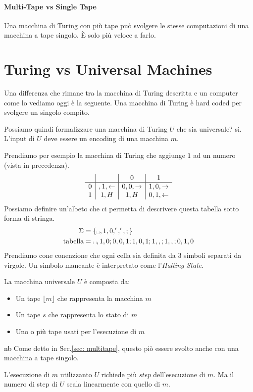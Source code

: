 \documentclass{article}
\begin{document}
\paragraph{Multi-Tape vs Single Tape}
Una macchina di Turing con più tape può svolgere le stesse computazioni di una macchina a tape singolo. È solo più veloce a farlo.

\section{Turing vs Universal Machines}
Una differenza che rimane tra la macchina di Turing descritta e un computer come lo vediamo oggi è la seguente. Una macchina di Turing è hard coded per svolgere un singolo compito.

Possiamo quindi formalizzare una macchina di Turing $U$ che sia universale? si. \\
L'input di $U$ deve essere un encoding di una macchina $m$.

Prendiamo per esempio la macchina di Turing che aggiunge $1$ ad un numero (vista in precedenza).
\[
    \begin{array}{c|c|c|c}
        & \textvisiblespace & 0 & 1 \\
        \hline
        0 & \textvisiblespace,1,\leftarrow & 0,0,\rightarrow & 1,0,\rightarrow \\
        1 & 1,H & 1, H & 0,1,\leftarrow
    \end{array}
\]
Possiamo definire un'albeto che ci permetta di descrivere questa tabella sotto forma di stringa.
\begin{align*}
    \Sigma &= \{\text{\textvisiblespace},1,0,',',;\} \\
    \text{tabella}&=\text{\textvisiblespace},1,0;0,0,1;1,0,1;1,,;1,,;0,1,0
\end{align*}
Prendiamo cone conenzione che ogni cella sia definita da 3 simboli separati da virgole. Un simbolo mancante è interpretato come l'\textit{Halting State}.

La macchina universale $U$ è composta da:
\begin{itemize}
    \item Un tape $\lfloor m\rfloor$ che rappresenta la macchina $m$
    \item Un tape $s$ che rappresenta lo stato di $m$
    \item Uno o più tape usati per l'esecuzione di $m$
\end{itemize}
\begin{callout}{nb}
    Come detto in Sec.\ref{sec: multitape}, questo piò essere svolto anche con una macchina a tape singolo.
\end{callout}
L'esecuzione di $m$ utilizzanto $U$ richiede più \textit{step} dell'esecuzione di $m$. Ma il numero di step di $U$ scala linearmente con quello di $m$.
\end{document}
